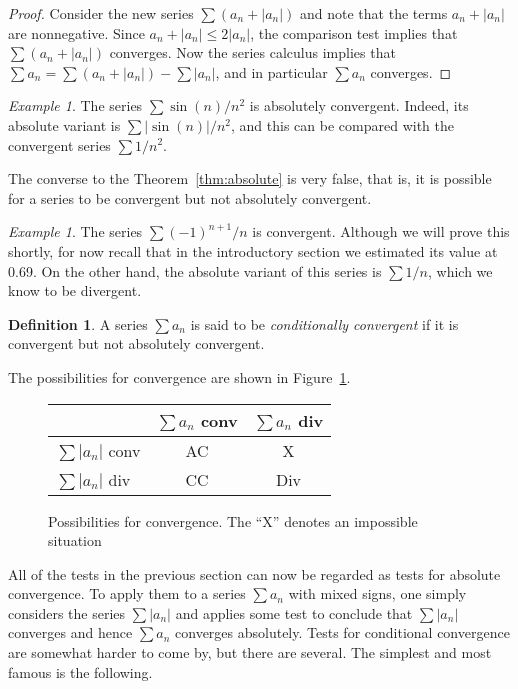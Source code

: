 \documentclass[11pt,oneside]{amsbook}
\theoremstyle{definition}
\theoremstyle{plain}
\theoremstyle{definition}
\newtheorem{defn}[thm]{Definition}
\theoremstyle{remark}
\newtheorem{example}[thm]{Example}
\numberwithin{equation}{section}
\numberwithin{figure}{section}
\begin{document}
\begin{proof}
  Consider the new series $\sum(a_n+|a_n|)$ and note that the terms $a_n+|a_n|$ are nonnegative. Since $a_n+|a_n|\leq2|a_n|$, the comparison test implies that $\sum(a_n+|a_n|)$ converges. Now the series calculus implies that $\sum a_n=\sum(a_n+|a_n|)-\sum|a_n|$, and in particular $\sum a_n$ converges.
\end{proof}


\begin{example}
  The series $\sum\sin(n)/n^2$ is absolutely convergent. Indeed, its absolute variant is $\sum|\sin(n)|/n^2$, and this can be compared with the convergent series $\sum 1/n^2$.
\end{example}

The converse to the Theorem~\ref{thm:absolute} is very false, that is, it is possible for a series to be convergent but not absolutely convergent.

\begin{example}
  The series $\sum(-1)^{n+1}/n$ is convergent. Although we will prove this shortly, for now recall that in the introductory section we estimated its value at 0.69. On the other hand, the absolute variant of this series is $\sum 1/n$, which we know to be divergent.
\end{example}

\begin{defn}
  A series $\sum a_n$ is said to be \emph{conditionally convergent} if it is convergent but not absolutely convergent.
\end{defn}

The possibilities for convergence are shown in Figure~\ref{fig:convergence}.

\begin{figure}[h]
  \begin{tabular}{l|cc}
                     & $\sum a_n$ conv & $\sum a_n$ div\\\hline
    $\sum|a_n|$ conv & AC & X\\
    $\sum|a_n|$ div & CC & Div
  \end{tabular}
  \caption{Possibilities for convergence. The ``X'' denotes an impossible situation\label{fig:convergence}}
\end{figure}

All of the tests in the previous section can now be regarded as tests for absolute convergence. To apply them to a series $\sum a_n$ with mixed signs, one simply considers the series $\sum|a_n|$ and applies some test to conclude that $\sum|a_n|$ converges and hence $\sum a_n$ converges absolutely. Tests for conditional convergence are somewhat harder to come by, but there are several. The simplest and most famous is the following.
\end{document}
